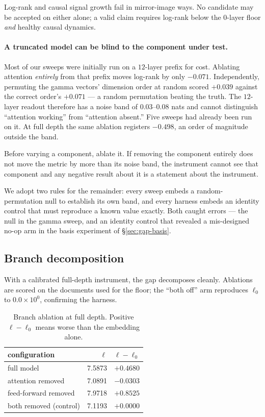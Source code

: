 \begin{finding}
Log-rank and causal signal growth fail in mirror-image ways. No candidate may be accepted on
either alone; a valid claim requires log-rank below the $0$-layer floor \emph{and} healthy causal
dynamics.
\end{finding}

\paragraph{A truncated model can be blind to the component under test.} Most of our sweeps were
initially run on a $12$-layer prefix for cost. Ablating attention \emph{entirely} from that prefix
moves log-rank by only $-0.071$. Independently, permuting the gamma vectors' dimension order at
random scored $+0.039$ against the correct order's $+0.071$ --- a random permutation beating the
truth. The $12$-layer readout therefore has a noise band of $0.03$--$0.08$ nats and cannot
distinguish ``attention working'' from ``attention absent.'' Five sweeps had already been run on
it. At full depth the same ablation registers $-0.498$, an order of magnitude outside the band.

\begin{finding}
Before varying a component, ablate it. If removing the component entirely does not move the
metric by more than its noise band, the instrument cannot see that component and any negative
result about it is a statement about the instrument.
\end{finding}

We adopt two rules for the remainder: every sweep embeds a random-permutation null to establish
its own band, and every harness embeds an identity control that must reproduce a known value
exactly. Both caught errors --- the null in the gamma sweep, and an identity control that revealed
a mis-designed no-op arm in the basis experiment of \S\ref{sec:gap-basis}.

\subsection{Branch decomposition}

With a calibrated full-depth instrument, the gap decomposes cleanly. Ablations are scored on the
documents used for the floor; the ``both off'' arm reproduces $\ell_0$ to $0.0\times10^{0}$,
confirming the harness.

\begin{table}[h]
\centering\small
\caption{Branch ablation at full depth. Positive $\ell-\ell_0$ means worse than the embedding alone.}
\begin{tabular}{lrr}
\toprule
configuration & $\ell$ & $\ell-\ell_0$ \\
\midrule
full model & 7.5873 & $+0.4680$ \\
attention removed & 7.0891 & $-0.0303$ \\
feed-forward removed & 7.9718 & $+0.8525$ \\
both removed (control) & 7.1193 & $+0.0000$ \\
\bottomrule
\end{tabular}
\end{table}

